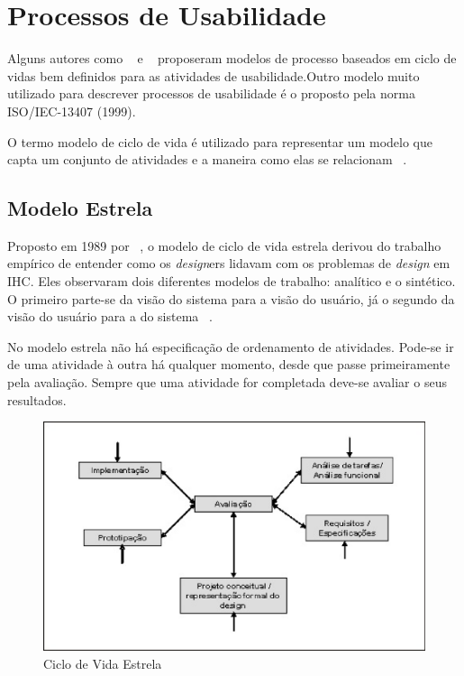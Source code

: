 
\section{Processos de Usabilidade}


	Alguns autores como ~ e ~ proposeram modelos de processo baseados em ciclo de vidas bem definidos para as atividades de usabilidade.Outro modelo muito utilizado para descrever processos de usabilidade é o proposto pela norma ISO/IEC-13407 (1999).

	O termo modelo de ciclo de vida é utilizado para representar um modelo que capta um conjunto de atividades e a maneira como elas se relacionam ~\cite{preece2007}.

\subsection{Modelo Estrela}

	Proposto em 1989 por ~\citeauthor{hix1993}, o modelo de ciclo de vida estrela derivou do trabalho empírico de entender como os \emph{design}ers lidavam com os problemas de \emph{design} em IHC. Eles observaram dois diferentes modelos de trabalho: analítico e o sintético. O primeiro parte-se da visão do sistema para a visão do usuário, já o segundo da visão do usuário para a do sistema ~\cite{cybis2010}.

	No modelo estrela não há especificação de ordenamento de atividades. Pode-se ir de uma atividade à outra há qualquer momento, desde que passe primeiramente pela avaliação. Sempre que uma atividade for completada deve-se avaliar o seus resultados.

\begin{figure}[h]
    \centering
    \includegraphics[keepaspectratio=true,scale=0.60]
      {figuras/estrela.eps}
    \caption{Ciclo de Vida Estrela}
    \label{ciclo_estrela}
\end{figure}

